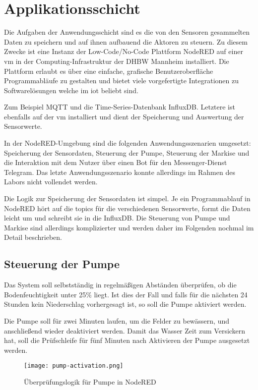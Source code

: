
\section{Applikationsschicht}

Die Aufgaben der Anwendungsschicht sind es die von den Sensoren gesammelten Daten zu speichern und auf ihnen aufbauend die Aktoren zu steuern.
Zu diesem Zwecke ist eine Instanz der Low-Code/No-Code Plattform NodeRED auf einer \gls{vm} in der Computing-Infrastruktur der DHBW Mannheim installiert.
Die Plattform erlaubt es über eine einfache, grafische Benutzeroberfläche Programmabläufe zu gestalten und bietet viele vorgefertigte Integrationen zu Softwarelösungen welche im \gls{iot} beliebt sind.

Zum Beispiel MQTT und die Time-Series-Datenbank InfluxDB.
Letztere ist ebenfalls auf der \gls{vm} installiert und dient der Speicherung und Auswertung der Sensorwerte.

In der NodeRED-Umgebung sind die folgenden Anwendungsszenarien umgesetzt: Speicherung der Sensordaten, Steuerung der Pumpe, Steuerung der Markise und die Interaktion mit dem Nutzer über einen Bot für den Messenger-Dienst Telegram.
Das letzte Anwendungsszenario konnte allerdings im Rahmen des Labors nicht vollendet werden.

Die Logik zur Speicherung der Sensordaten ist simpel.
Je ein Programmablauf in NodeRED hört auf die topics für die verschiedenen Sensorwerte, formt die Daten leicht um und schreibt sie in die InfluxDB.
Die Steuerung von Pumpe und Markise sind allerdings komplizierter und werden daher im Folgenden nochmal im Detail beschrieben.

\subsection{Steuerung der Pumpe}

Das System soll selbstständig in regelmäßigen Abständen überprüfen, ob die Bodenfeuchtigkeit unter 25\% liegt.
Ist dies der Fall und falls für die nächsten 24 Stunden kein Niederschlag vorhergesagt ist, so soll die Pumpe aktiviert werden.

Die Pumpe soll für zwei Minuten laufen, um die Felder zu bewässern, und anschließend wieder deaktiviert werden.
Damit das Wasser Zeit zum Versickern hat, soll die Prüfschleife für fünf Minuten nach Aktivieren der Pumpe ausgesetzt werden.

\begin{figure}[h]
  \centering
  \texttt{[image: pump-activation.png]}
  \caption{Überprüfungslogik für Pumpe in NodeRED}\label{fig:pump-activation}
\end{figure}

